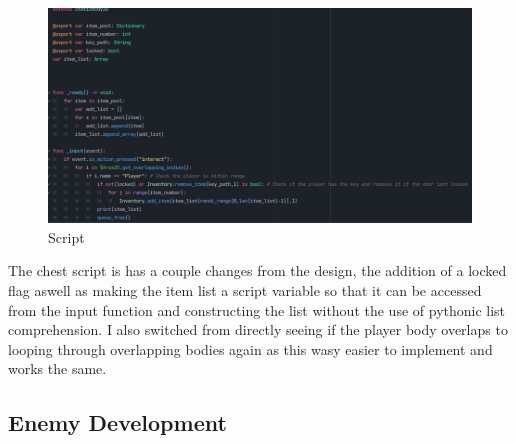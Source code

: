 \documentclass{article}
\begin{document}
        \begin{figure}[H]
                \centering
                \includegraphics[width = 0.9\columnwidth]{images/development/Chest_script.PNG}
                \caption{Script}
        \end{figure}
        \noindent The chest script is has a couple changes from the design, the addition of a locked flag aswell as making the item list a script variable so that it can be accessed from the input function and constructing the list without the use of pythonic list comprehension. I also switched from directly seeing if the player body overlaps to looping through overlapping bodies again as this wasy easier to implement and works the same.\\
        \subsection{Enemy Development}
\end{document}
